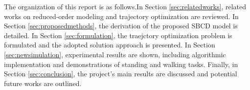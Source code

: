 \documentclass[main.tex]{subfiles}
\begin{document}
\begin{sloppypar}
The organization of this report is as follows.In Section \ref{sec:relatedworks}, related works on reduced-order modeling and trajectory optimization are reviewed. In Section \ref{sec:proposedmethods}, the derivation of the proposed SBCD model is detailed. In Section \ref{sec:formulation}, the traejctory optimization problem is formulated and the adopted solution approach is presented. In Section \ref{sec:newsimulation}, experimental results are shown, including algorithmic implementation and demonstrations of standing and walking tasks. Finally, in Section \ref{sec:conclusion}, the project's main results are discussed and potential future works are outlined.
\end{sloppypar}
\end{document}
